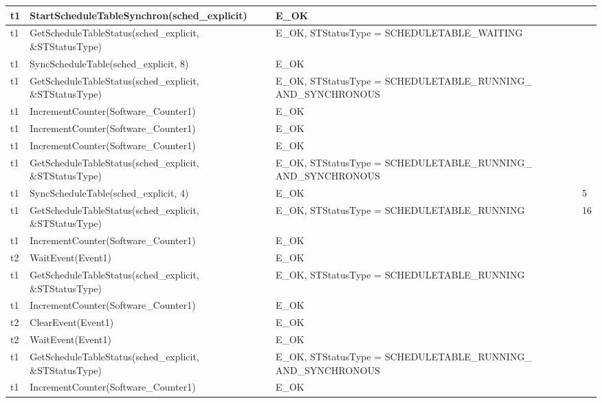\documentclass[10pt]{article}
\newlength{\Li}\settowidth{\Li}{Running}
\newlength{\Lii}\setlength{\Lii}{7cm}
\newlength{\Liiii}\setlength{\Liiii}{0.9cm}
\newlength{\Liii}\setlength{\Liii}{\textwidth} \addtolength{\Liii}{-\Li} \addtolength{\Liii}{-\Lii} \addtolength{\Liii}{-\Liiii}
\begin{document}
	\begin{supertabular}{|p{\Li}|p{\Lii}|p{\Liii}|p{\Liiii}|} \hline 
	t1		& StartScheduleTableSynchron(sched\_explicit)					& E\_OK																	& \\ \hline
	t1		& GetScheduleTableStatus(sched\_explicit, \&STStatusType)			& E\_OK, STStatusType = SCHEDULETABLE\_WAITING								& \\ \hline
	t1		& SyncScheduleTable(sched\_explicit, 8)							& E\_OK																	& \\ \hline
	t1		& GetScheduleTableStatus(sched\_explicit, \&STStatusType)			& E\_OK, STStatusType = SCHEDULETABLE\_RUNNING\_ AND\_SYNCHRONOUS		& \\ \hline
	t1		& IncrementCounter(Software\_Counter1)						& E\_OK																	& \\ \hline
	t1		& IncrementCounter(Software\_Counter1)						& E\_OK																	& \\ \hline
	t1		& IncrementCounter(Software\_Counter1)						& E\_OK																	& \\ \hline
	t1		& GetScheduleTableStatus(sched\_explicit, \&STStatusType)			& E\_OK, STStatusType = SCHEDULETABLE\_RUNNING\_ AND\_SYNCHRONOUS		& \\ \hline
	t1		& SyncScheduleTable(sched\_explicit, 4)							& E\_OK																	& 5 \\ \hline
	t1		& GetScheduleTableStatus(sched\_explicit, \&STStatusType)			& E\_OK, STStatusType = SCHEDULETABLE\_RUNNING 							& 16 \\ \hline
	t1		& IncrementCounter(Software\_Counter1)						& E\_OK																	& \\ \hline
	t2		& WaitEvent(Event1)											& E\_OK																	& \\ \hline
	t1		& GetScheduleTableStatus(sched\_explicit, \&STStatusType)			& E\_OK, STStatusType = SCHEDULETABLE\_RUNNING 							& \\ \hline
	t1		& IncrementCounter(Software\_Counter1)						& E\_OK																	& \\ \hline
	t2		& ClearEvent(Event1)										& E\_OK																	& \\ \hline
	t2		& WaitEvent(Event1)											& E\_OK																	& \\ \hline
	t1		& GetScheduleTableStatus(sched\_explicit, \&STStatusType)			& E\_OK, STStatusType = SCHEDULETABLE\_RUNNING\_ AND\_SYNCHRONOUS		& \\ \hline
	t1		& IncrementCounter(Software\_Counter1)						& E\_OK																	& \\ \hline

\end{supertabular}
\end{document}
